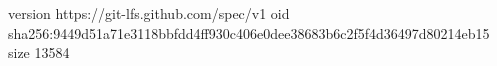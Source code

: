 version https://git-lfs.github.com/spec/v1
oid sha256:9449d51a71e3118bbfdd4ff930c406e0dee38683b6c2f5f4d36497d80214eb15
size 13584
